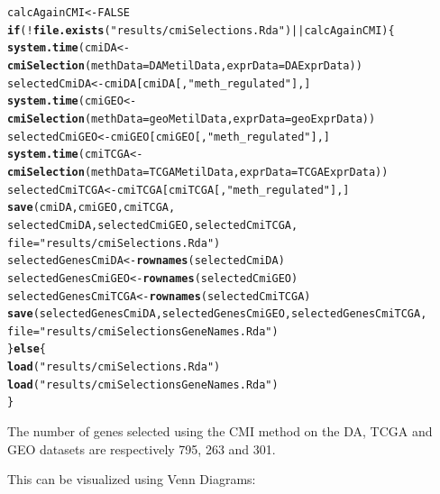 \documentclass[a4paper,10pt]{article}\usepackage[]{graphicx}\usepackage[]{color}
\makeatletter
\newcommand{\hlnum}[1]{\textcolor[rgb]{0.686,0.059,0.569}{#1}}%
\newcommand{\hlstr}[1]{\textcolor[rgb]{0.192,0.494,0.8}{#1}}%
\newcommand{\hlopt}[1]{\textcolor[rgb]{0,0,0}{#1}}%
\newcommand{\hlstd}[1]{\textcolor[rgb]{0.345,0.345,0.345}{#1}}%
\newcommand{\hlkwa}[1]{\textcolor[rgb]{0.161,0.373,0.58}{\textbf{#1}}}%
\newcommand{\hlkwb}[1]{\textcolor[rgb]{0.69,0.353,0.396}{#1}}%
\newcommand{\hlkwc}[1]{\textcolor[rgb]{0.333,0.667,0.333}{#1}}%
\newcommand{\hlkwd}[1]{\textcolor[rgb]{0.737,0.353,0.396}{\textbf{#1}}}%
\newenvironment{kframe}{%
 \def\at@end@of@kframe{}%
 \ifinner\ifhmode%
  \def\at@end@of@kframe{\end{minipage}}%
  \begin{minipage}{\columnwidth}%
 \fi\fi%
 \def\FrameCommand##1{\hskip\@totalleftmargin \hskip-\fboxsep
 \colorbox{shadecolor}{##1}\hskip-\fboxsep
     \hskip-\linewidth \hskip-\@totalleftmargin \hskip\columnwidth}%
 \MakeFramed {\advance\hsize-\width
   \@totalleftmargin\z@ \linewidth\hsize
   \@setminipage}}%
 {\par\unskip\endMakeFramed%
 \at@end@of@kframe}
\newenvironment{knitrout}{}{} %
\makeatother
\begin{document}

\begin{knitrout}
\color{fgcolor}\begin{kframe}
\begin{alltt}
\hlstd{calcAgainCMI} \hlkwb{<-} \hlnum{FALSE}
\hlkwa{if} \hlstd{(}\hlopt{!}\hlkwd{file.exists}\hlstd{(}\hlstr{"results/cmiSelections.Rda"}\hlstd{)} \hlopt{||} \hlstd{calcAgainCMI)\{}
  \hlkwd{system.time}\hlstd{(cmiDA} \hlkwb{<-} \hlkwd{cmiSelection} \hlstd{(}\hlkwc{methData} \hlstd{= DAMetilData,} \hlkwc{exprData} \hlstd{= DAExprData ))}
  \hlstd{selectedCmiDA} \hlkwb{<-}\hlstd{cmiDA[cmiDA[,}\hlstr{"meth_regulated"}\hlstd{],]}
  \hlkwd{system.time}\hlstd{(cmiGEO} \hlkwb{<-} \hlkwd{cmiSelection} \hlstd{(}\hlkwc{methData} \hlstd{= geoMetilData,} \hlkwc{exprData} \hlstd{= geoExprData))}
  \hlstd{selectedCmiGEO} \hlkwb{<-}\hlstd{cmiGEO[cmiGEO[,}\hlstr{"meth_regulated"}\hlstd{],]}
  \hlkwd{system.time}\hlstd{(cmiTCGA} \hlkwb{<-} \hlkwd{cmiSelection} \hlstd{(}\hlkwc{methData} \hlstd{= TCGAMetilData,} \hlkwc{exprData} \hlstd{= TCGAExprData))}
  \hlstd{selectedCmiTCGA} \hlkwb{<-}\hlstd{cmiTCGA[cmiTCGA[,}\hlstr{"meth_regulated"}\hlstd{],]}
  \hlkwd{save}\hlstd{(cmiDA, cmiGEO, cmiTCGA,}
         \hlstd{selectedCmiDA, selectedCmiGEO, selectedCmiTCGA,}
         \hlkwc{file}\hlstd{=}\hlstr{"results/cmiSelections.Rda"}\hlstd{)}
  \hlstd{selectedGenesCmiDA} \hlkwb{<-} \hlkwd{rownames}\hlstd{(selectedCmiDA)}
  \hlstd{selectedGenesCmiGEO} \hlkwb{<-} \hlkwd{rownames}\hlstd{(selectedCmiGEO)}
  \hlstd{selectedGenesCmiTCGA} \hlkwb{<-} \hlkwd{rownames}\hlstd{(selectedCmiTCGA)}
  \hlkwd{save}\hlstd{(selectedGenesCmiDA, selectedGenesCmiGEO, selectedGenesCmiTCGA,}
         \hlkwc{file}\hlstd{=}\hlstr{"results/cmiSelectionsGeneNames.Rda"}\hlstd{)}
\hlstd{\}}\hlkwa{else}\hlstd{\{}
    \hlkwd{load}\hlstd{(}\hlstr{"results/cmiSelections.Rda"}\hlstd{)}
    \hlkwd{load}\hlstd{(}\hlstr{"results/cmiSelectionsGeneNames.Rda"}\hlstd{)}
\hlstd{\}}
\end{alltt}
\end{kframe}
\end{knitrout}

The number of genes selected using the CMI method on the DA, TCGA and GEO datasets are respectively 
 795, 263 and 301.


This can be visualized using Venn Diagrams:
\end{document}
